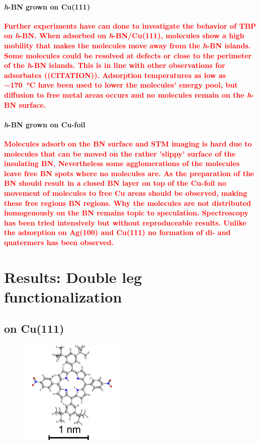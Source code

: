 	\paragraph{\textit{h}-BN grown on Cu(111)}
	\textcolor{red}{\textbf{
			Further experiments have can done to investigate the behavior of TBP on \textit{h}-BN. When adsorbed on \textit{h}-BN/Cu(111), molecules show a high mobility that makes the molecules move away from the \textit{h}-BN islands. Some molecules could be resolved at defects or close to the perimeter of the \textit{h}-BN islands. This is in line with other observations for adsorbates ((CITATION)). Adsorption temperatures as low as \SI{-170}{\celsius} have been used to lower the molecules' energy pool, but diffusion to free metal areas occurs and no molecules remain on the \textit{h}-BN surface.
		}}
		
		\paragraph{\textit{h}-BN grown on Cu-foil}
		\textcolor{red}{\textbf{
				Molecules adsorb on the BN surface and STM imaging is hard due to molecules that can be moved on the rather 'slippy' surface of the insulating BN. Nevertheless some agglomerations of the molecules leave free BN spots where no molecules are. As the preparation of the BN should result in a closed BN layer on top of the Cu-foil no movement of molecules to free Cu areas should be observed, making these free regions BN regions.
				Why the molecules are not distributed homogenously on the BN remains topic to speculation.
				Spectroscopy has been tried intensively but without reproduceable results.
				Unlike the adsorption on Ag(100) and Cu(111) no formation of di- and quatermers has been observed.
			}}

\section{Results: Double leg functionalization}
	\subsection{on Cu(111)}
	\begin{figure}\centering
		\includegraphics[width=5cm]{./images/molecules/max-zoom/TBP-trans-600-scalebar}
		\caption{}
	\end{figure}
	

